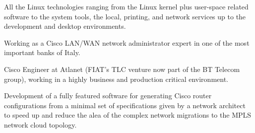 \tinyskip\noindent
\technologies
All the Linux technologies ranging from the Linux kernel plus user-space 
related software
to the system tools, the local,
printing, and network services up to the development
and desktop environments. %




Working as a Cisco LAN/WAN network administrator expert in one of the most
important banks of Italy.

%

%
 


Cisco Engineer at Atlanet (FIAT's TLC venture now part of the BT Telecom group), 
working in a highly business and production critical environment.

Development of a fully featured software for generating Cisco router
configurations from a minimal set of specifications given by a network architect
to speed up and reduce the alea of the complex network migrations to the
MPLS network cloud topology.

